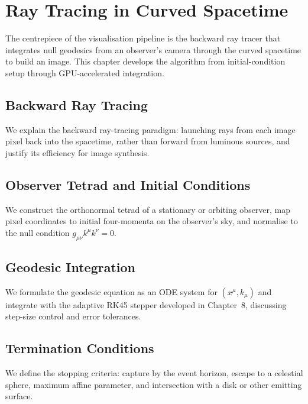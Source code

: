\chapter{Ray Tracing in Curved Spacetime}
\label{ch:ray-tracing}

The centrepiece of the visualisation pipeline is the backward ray tracer that
integrates null geodesics from an observer's camera through the curved
spacetime to build an image. This chapter develops the algorithm from
initial-condition setup through GPU-accelerated integration.

\section{Backward Ray Tracing}
\label{sec:rt-backward}

We explain the backward ray-tracing paradigm: launching rays from each image
pixel back into the spacetime, rather than forward from luminous sources,
and justify its efficiency for image synthesis.

\section{Observer Tetrad and Initial Conditions}
\label{sec:rt-tetrad}

We construct the orthonormal tetrad of a stationary or orbiting observer,
map pixel coordinates to initial four-momenta on the observer's sky, and
normalise to the null condition $g_{\mu\nu} k^\mu k^\nu = 0$.

\section{Geodesic Integration}
\label{sec:rt-integration}

We formulate the geodesic equation as an ODE system for $(x^\mu, k_\mu)$
and integrate with the adaptive RK45 stepper developed in Chapter~8,
discussing step-size control and error tolerances.

\section{Termination Conditions}
\label{sec:rt-termination}

We define the stopping criteria: capture by the event horizon, escape to a
celestial sphere, maximum affine parameter, and intersection with a disk
or other emitting surface.

